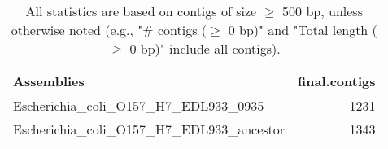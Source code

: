 \documentclass[12pt,a4paper]{article}
\begin{document}
\begin{table}[ht]
\begin{center}
\caption{All statistics are based on contigs of size $\geq$ 500 bp, unless otherwise noted (e.g., "\# contigs ($\geq$ 0 bp)" and "Total length ($\geq$ 0 bp)" include all contigs).}
\begin{tabular}{|l*{1}{|r}|}
\hline
Assemblies & final.contigs \\ \hline
Escherichia\_coli\_O157\_H7\_EDL933\_0935 & 1231 \\ \hline
Escherichia\_coli\_O157\_H7\_EDL933\_ancestor & 1343 \\ \hline
\end{tabular}
\end{center}
\end{table}
\end{document}

